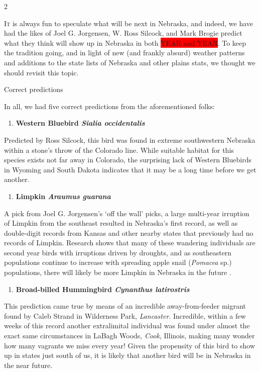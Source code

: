 \documentclass[10pt,letterpaper]{article}
\newcommand{\NewsItem}[1]{%
		\fontspec{QTBrushStroke}
		\large #1 \vspace{4pt}
		\par \normalsize \normalfont}
\begin{document}
\begin{multicols}{2}
	
	\lettrine{I}{t} is always fun to speculate what will be next in Nebraska, and indeed, we have had the likes of Joel G. Jorgensen, W. Ross Silcock, and Mark Brogie predict what they think will show up in Nebraska in both \colorbox{red}{YEAR and YEAR}. To keep the tradition going, and in light of new (and frankly absurd) weather patterns and additions to the state lists of Nebraska and other plains stats, we thought we should revisit this topic.
	
	\noindent \NewsItem{Correct predictions}
	
	\noindent In all, we had five correct predictions from the aforementioned folks:
	
	\begin{enumerate}
		\item \textbf{Western Bluebird \textit{Sialia occidentalis}}
	\end{enumerate}
	Predicted by Ross Silcock, this bird was found in extreme southwestern Nebraska within a stone's throw of the Colorado line. While suitable habitat for this species exists not far away in Colorado, the surprising lack of Western Bluebirds in Wyoming and South Dakota indicates that it may be a long time before we get another.
	
	\begin{enumerate}[resume]
		\item \textbf{Limpkin \textit{Araumus guarana}}
	\end{enumerate}
	A pick from Joel G. Jorgensen's `off the wall' picks, a large multi-year irruption of Limpkin from the southeast resulted in Nebraska's first record, as well as double-digit records from Kansas and other nearby states that previously had no records of Limpkin. Research shows that many of these wandering individuals are second year birds with irruptions driven by droughts, and as southeastern populations continue to increase with spreading apple snail (\textit{Pomacea} sp.) populations, there will likely be more Limpkin in Nebraska in the future \parencite{Mutchler02102025}.
	
	\begin{enumerate}[resume]
		\item \textbf{Broad-billed Hummingbird \textit{Cynanthus latirostris}}
	\end{enumerate}
	This prediction came true by means of an incredible away-from-feeder migrant found by Caleb Strand in Wilderness Park, \textit{Lancaster}. Incredible, within a few weeks of this record another extralimital individual was found under almost the exact same circumstances in LaBagh Woods, \textit{Cook}, Illinois, making many wonder how many vagrants we miss every year! Given the propensity of this bird to show up in states just south of us, it is likely that another bird will be in Nebraska in the near future.
	

\end{multicols}
\end{document}
